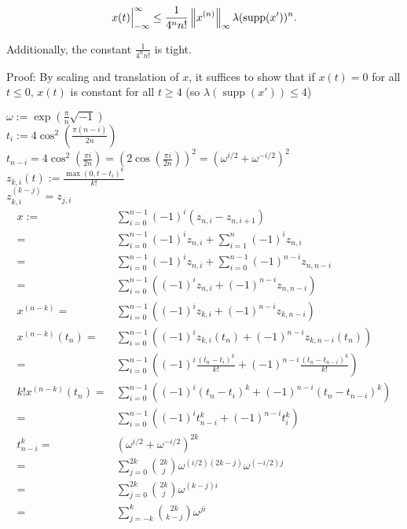 \documentclass{article}
\DeclareMathOperator{\supp}{supp}
\begin{document}
\[x(t)\Big|_{-\infty}^\infty \leq \frac{1}{4^nn!}\norm{x^{(n)}}_\infty\lambda(\supp(x'))^n.\]

Additionally, the constant $\frac{1}{4^nn!}$ is tight.

Proof: By scaling and translation of $x$, it suffices to show that
if $x(t) = 0$ for all $t \leq 0$, $x(t)$ is constant for all $t \geq 4$
(so $\lambda(\supp(x')) \leq 4$)

$\omega := \exp\left(\frac{\pi}{n}\sqrt{-1}\right)$ \\
$t_i := 4\cos^2\left(\frac{\pi (n-i)}{2n}\right)$ \\
$t_{n-i} = 4\cos^2\left(\frac{\pi i}{2n}\right)
= \left(2\cos\left(\frac{\pi i}{2n}\right)\right)^2
= \left(\omega^{i/2}+\omega^{-i/2}\right)^2$ \\
$z_{k,i}(t) := \frac{\max(0, t-t_i)^k}{k!}$ \\
$z_{k,i}^{(k-j)} = z_{j,i}$ \\
\begin{align*}
  x :=& \sum_{i=0}^{n-1}(-1)^i(z_{n,i} - z_{n,i+1}) \\
  =& \sum_{i=0}^{n-1}(-1)^iz_{n,i} + \sum_{i=1}^n(-1)^iz_{n,i} \\
  =& \sum_{i=0}^{n-1}(-1)^iz_{n,i} + \sum_{i=0}^{n-1}(-1)^{n-i}z_{n,n-i} \\
  =& \sum_{i=0}^{n-1} \left((-1)^iz_{n,i} + (-1)^{n-i}z_{n,n-i}\right) \\
  x^{(n-k)} =& \sum_{i=0}^{n-1} \left((-1)^iz_{k,i} + (-1)^{n-i}z_{k,n-i}\right) \\
  x^{(n-k)}(t_n) =& \sum_{i=0}^{n-1} \left((-1)^iz_{k,i}(t_n) + (-1)^{n-i}z_{k,n-i}(t_n)\right) \\
  =& \sum_{i=0}^{n-1} \left((-1)^i\frac{(t_n-t_i)^k}{k!} + (-1)^{n-i}\frac{(t_n-t_{n-i})^k}{k!}\right) \\
  k!x^{(n-k)}(t_n) =& \sum_{i=0}^{n-1} \left((-1)^i(t_n-t_i)^k + (-1)^{n-i}(t_n-t_{n-i})^k\right) \\
  =& \sum_{i=0}^{n-1} \left((-1)^it_{n-i}^k + (-1)^{n-i}t_i^k\right) \\
  t_{n-i}^k =& \left(\omega^{i/2}+\omega^{-i/2}\right)^{2k} \\
  =& \sum_{j=0}^{2k}\binom{2k}{j}\omega^{(i/2)(2k-j)}\omega^{(-i/2)j} \\
  =& \sum_{j=0}^{2k}\binom{2k}{j}\omega^{(k-j)i} \\
  =& \sum_{j=-k}^k\binom{2k}{k-j}\omega^{ji}
\end{align*}
\end{document}
